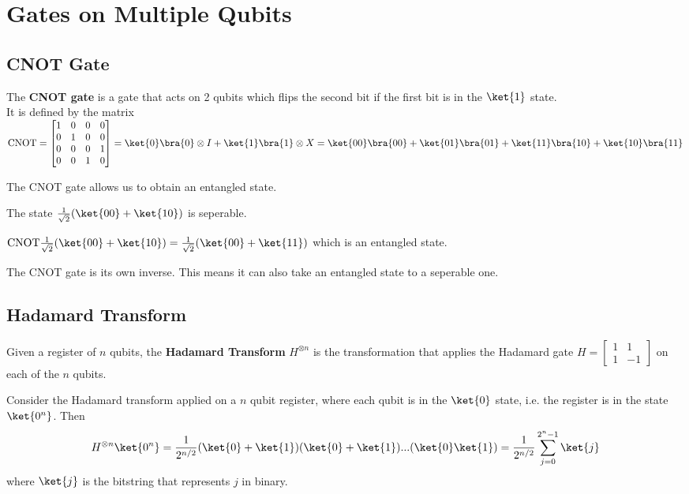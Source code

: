 \section{Gates on Multiple Qubits}

\subsection{CNOT Gate}
\begin{defn}
    The \textbf{CNOT gate} is a gate that acts on 2 qubits which flips the second bit if the first bit is in the $\ket{1}$ state.\\
    It is defined by the matrix $\text{CNOT} = \begin{bmatrix} 1 & 0 & 0 & 0 \\ 0 & 1 & 0 & 0 \\ 0 & 0 & 0 & 1 \\ 0 & 0 & 1 & 0 \end{bmatrix} = \ket{0}\bra{0} \otimes I + \ket{1}\bra{1} \otimes X = \ket{00}\bra{00} + \ket{01}\bra{01} + \ket{11} \bra{10} + \ket{10} \bra{11}$ 
\end{defn}
The CNOT gate allows us to obtain an entangled state.
\begin{eg}
    The state $\frac{1}{\sqrt{2}}(\ket{00} + \ket{10})$ is seperable.

    $\text{CNOT} \frac{1}{\sqrt{2}}(\ket{00} + \ket{10}) = \frac{1}{\sqrt{2}} (\ket{00} + \ket{11}) $ which is an entangled state.
\end{eg}

The CNOT gate is its own inverse. This means it can also take an entangled state to a seperable one.

\subsection{Hadamard Transform}
\begin{defn}
    Given a register of $n$ qubits, the \textbf{Hadamard Transform} $H^{\otimes n}$ is the transformation that applies the Hadamard gate $H = \begin{bmatrix} 1 & 1 \\ 1 & -1 \end{bmatrix}$ on each of the $n$ qubits.
\end{defn}
\begin{eg}
    Consider the Hadamard transform applied on a $n$ qubit register, where each qubit is in the $\ket{0}$ state, i.e. the register is in the state $\ket{0^n}$.
    Then \[ H^{\otimes n} \ket{0^n} = \frac{1}{2^{n/2}} (\ket{0} + \ket{1})(\ket{0} + \ket{1})...(\ket{0} \ket{1}) = \frac{1}{2^{n/2}} \sum_{j=0}^{2^n-1} \ket{j} \] where $\ket{j}$ is the bitstring that represents $j$ in binary.
\end{eg}

